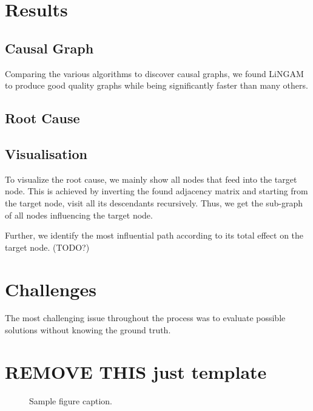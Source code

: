 \documentclass{article}
\begin{document}
    \section{Results} %

    \subsection{Causal Graph}

    Comparing the various algorithms to discover causal graphs, we found LiNGAM to produce good quality graphs while being significantly faster than many others. 
    
    \subsection{Root Cause}
    
    
    
    \subsection{Visualisation}

    To visualize the root cause, we mainly show all nodes that feed into the target node. This is achieved by inverting the found adjacency matrix and starting from the target node, visit all its descendants recursively. Thus, we get the sub-graph of all nodes influencing the target node. 

    Further, we identify the most influential path according to its total effect on the target node. (TODO?) 
    
    
    \section{Challenges} %
    The most challenging issue throughout the process was to evaluate possible solutions without knowing the ground truth.

    \section{REMOVE THIS just template}
	
	\begin{figure}
		\centering
		\fbox{\rule[-.5cm]{0cm}{4cm} \rule[-.5cm]{4cm}{0cm}}
		\caption{Sample figure caption.}
	\end{figure}
	
\end{document}
